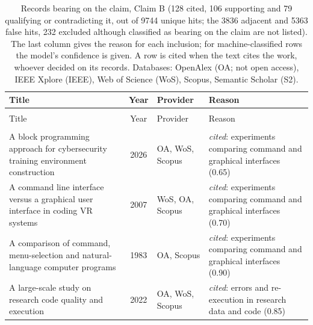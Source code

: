 
\begingroup\footnotesize
\begin{longtable}{@{}%
  >{\raggedright\arraybackslash}p{}c%
  >{\raggedright\arraybackslash}p{}%
  >{\raggedright\arraybackslash}p{}@{}}
\caption{Records bearing on the claim, Claim B (128 cited, 106 supporting and 79 qualifying or contradicting it, out of 9744 unique hits; the 3836 adjacent and 5363 false hits, 232 excluded although classified as bearing on the claim are not listed). The last column gives the reason for each inclusion; for machine-classified rows the model's confidence is given. A row is cited when the text cites the work, whoever decided on its records. Databases: OpenAlex (OA; not open access), IEEE Xplore (IEEE), Web of Science (WoS), Scopus, Semantic Scholar (S2).}\label{tab:sok-cli-efficiency}\\
\toprule
Title & Year & Provider & Reason \\
\midrule
\endfirsthead
\multicolumn{4}{@{}l}{\emph{\tablename~\thetable{} (cont.)}}\\
\toprule
Title & Year & Provider & Reason \\
\midrule
\endhead
\midrule \multicolumn{4}{r@{}}{\emph{continued on next page}}\\
\endfoot
\bottomrule
\endlastfoot
A block programming approach for cybersecurity training environment construction & 2026 & OA, WoS, Scopus & \emph{cited}: experiments comparing command and graphical interfaces (0.65) \\
A command line interface versus a graphical user interface in coding VR systems & 2007 & WoS, OA, Scopus & \emph{cited}: experiments comparing command and graphical interfaces (0.70) \\
A comparison of command, menu-selection and natural-language computer programs & 1983 & OA, Scopus & \emph{cited}: experiments comparing command and graphical interfaces (0.90) \\
A large-scale study on research code quality and execution & 2022 & OA, WoS, Scopus & \emph{cited}: errors and re-execution in research data and code (0.85) \\

\end{longtable}
